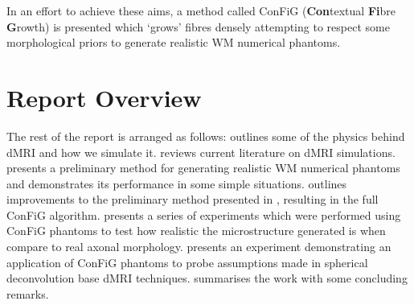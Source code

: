 In an effort to achieve these aims, a method called \acs{ConFiG} (\textbf{Con}textual \textbf{Fi}bre \textbf{G}rowth) is presented which `grows' fibres densely attempting to respect some morphological priors to generate realistic \ac{WM} numerical phantoms.


\section{Report Overview}
\label{sec:intro_report_overview}
The rest of the report is arranged as follows:  outlines some of the physics behind \acl{dMRI} and how we simulate it.  reviews current literature on \ac{dMRI} simulations.~ presents a preliminary method for generating realistic \ac{WM} numerical phantoms and demonstrates its performance in some simple situations.  outlines improvements to the preliminary method presented in , resulting in the full \ac{ConFiG} algorithm.  presents a series of experiments which were performed using \ac{ConFiG} phantoms to test how realistic the microstructure generated is when compare to real axonal morphology.  presents an experiment demonstrating an application of ConFiG phantoms to probe assumptions made in spherical deconvolution base \ac{dMRI} techniques.  summarises the work with some concluding remarks.



